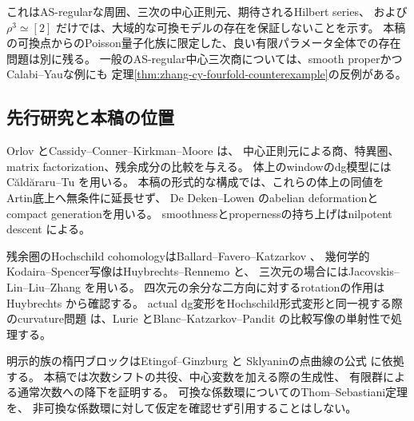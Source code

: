 これはAS-regularな周囲、三次の中心正則元、期待されるHilbert series、
および \(\rho^3\simeq[2]\) だけでは、大域的な可換モデルの存在を保証しないことを示す。
本稿の可換点からのPoisson量子化族に限定した、良い有限パラメータ全体での存在問題は別に残る。
一般のAS-regular中心三次商については、smooth properかつCalabi--Yauな例にも
定理\ref{thm:zhang-cy-fourfold-counterexample}の反例がある。

\subsection{先行研究と本稿の位置}

Orlov \cite{Orlov} とCassidy--Conner--Kirkman--Moore \cite{CCKM} は、
中心正則元による商、特異圏、matrix factorization、残余成分の比較を与える。
体上のwindowのdg模型にはCăldăraru--Tu \cite[Theorem 5.8]{CT} を用いる。
本稿の形式的な構成では、これらの体上の同値をArtin底上へ無条件に延長せず、
De Deken--Lowen \cite{DDL} のabelian deformationとcompact generationを用いる。
smoothnessとpropernessの持ち上げはnilpotent descent
\cite{Mathew}による。

残余圏のHochschild cohomologyはBallard--Favero--Katzarkov \cite{BFK}、
幾何学的Kodaira--Spencer写像はHuybrechts--Rennemo \cite{HR} と、
三次元の場合にはJacovskis--Lin--Liu--Zhang \cite{JLLZ} を用いる。
四次元の余分な二方向に対するrotationの作用は
Huybrechts \cite[Proposition 3.12]{Huy} から確認する。
actual dg変形をHochschild形式変形と同一視する際のcurvature問題
\cite{KL}は、Lurie \cite{Lurie} とBlanc--Katzarkov--Pandit
\cite{BKP} の比較写像の単射性で処理する。

明示的族の楕円ブロックはEtingof--Ginzburg \cite{EG} と
Sklyaninの点曲線の公式 \cite{Walton} に依拠する。
本稿では次数シフトの共役、中心変数を加える際の生成性、
有限群による通常次数への降下を証明する。
可換な係数環についてのThom--Sebastiani定理を、
非可換な係数環に対して仮定を確認せず引用することはしない。

